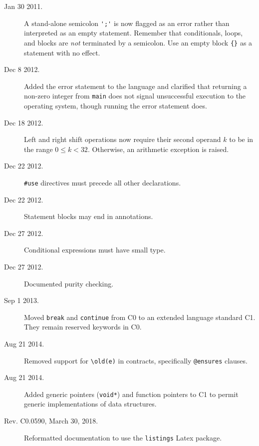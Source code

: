 \documentclass[11pt]{article}
\begin{document}
\begin{description}
\item[Jan 30 2011.]%
  A stand-alone semicolon \lstinline"';'" is now flagged as an error
  rather than interpreted as an empty statement.  Remember that
  conditionals, loops, and blocks are \emph{not} terminated by a
  semicolon.  Use an empty block \lstinline'{}' as a statement with no
  effect.
\item[Dec 8 2012.]%
  Added the error statement to the language and clarified that
  returning a non-zero integer from \lstinline'main' does not signal
  unsuccessful execution to the operating system, though running the
  error statement does.
\item[Dec 18 2012.]%
  Left and right shift operations now require their second operand $k$
  to be in the range $0 \leq k < 32$.  Otherwise, an arithmetic
  exception is raised.
\item[Dec 22 2012.]%
  \lstinline'#use' directives must precede all other declarations.
\item[Dec 22 2012.]%
  Statement blocks may end in annotations.
\item[Dec 27 2012.]%
  Conditional expressions must have small type.
\item[Dec 27 2012.]%
  Documented purity checking.
\item[Sep 1 2013.]%
  Moved \lstinline'break' and \lstinline'continue' from C0 to an
  extended language standard C1.  They remain reserved keywords in C0.
\item[Aug 21 2014.]%
  Removed support for \lstinline'\old(e)' in contracts, specifically
  \lstinline'@ensures' clauses.
\item[Aug 21 2014.]%
  Added generic pointers (\lstinline'void*') and function pointers to
  C1 to permit generic implementations of data structures.
\item[Rev. C0.0590, March 30, 2018.]%
  Reformatted documentation to use the \lstinline'listings' Latex
  package.
\end{description}
\end{document}

